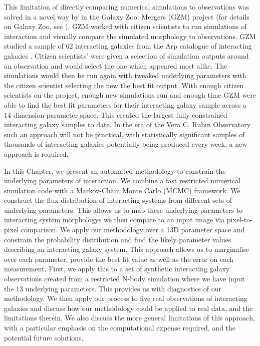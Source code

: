 This limitation of directly comparing numerical simulations to observations was solved in a novel way by \citet{2016MNRAS.459..720H} in the Galaxy Zoo: Mergers (GZM) project (for details on Galaxy Zoo, see \citet{2008MNRAS.389.1179L}). GZM worked with citizen scientists to run simulations of interaction and visually compare the simulated morphology to observations. GZM studied a sample of 62 interacting galaxies from the Arp catalogue of interacting galaxies \citep{1966ApJS...14....1A}. Citizen scientists' were given a selection of simulation outputs around an observation and would select the one which appeared most alike. The simulations would then be run again with tweaked underlying parameters with the citizen scientist selecting the new the best fit output. With enough citizen scientists on the project, enough new simulations run and enough time GZM were able to find the best fit parameters for their interacting galaxy sample across a 14-dimension parameter space. This created the largest fully constrained interacting galaxy samples to date. In the era of the Vera C. Rubin Observatory such an approach will not be practical, with statistically significant samples of thousands of interacting galaxies potentially being produced every week, a new approach is required.

In this Chapter, we present an automated methodology to constrain the underlying parameters of interaction. We combine a fast restricted numerical simulation code with a Markov-Chain Monte Carlo (MCMC) framework. We construct the flux distribution of interacting systems from different sets of underlying parameters. This allows us to map these underlying parameters to interacting system morphologys we then compare to an input image via pixel-to-pixel comparison. We apply our methodology over a 13D parameter space and constrain the probability distribution and find the likely parameter values describing an interacting galaxy system. This approach allows us to marginalise over each parameter, provide the best fit value as well as the error on each measurement. First, we apply this to a set of synthetic interacting galaxy observations created from a restricted N-body simulation where we have input the 13 underlying parameters. This provides us with diagnostics of our methodology. We then apply our process to five real observations of interacting galaxies and discuss how our methodology could be applied to real data, and the limitations therein. We also discuss the more general limitations of this approach, with a particular emphasis on the computational expense required, and the potential future solutions.

